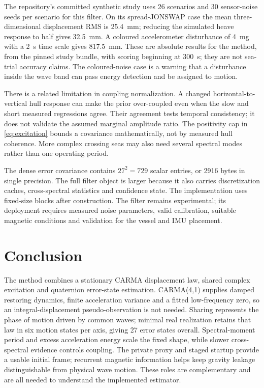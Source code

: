 \documentclass[conference]{IEEEtran}
\begin{document}
The repository's committed synthetic study uses 26 scenarios and 30
sensor-noise seeds per scenario for this filter. On its spread-JONSWAP
case the mean three-dimensional displacement RMS is 25.4~mm; reducing
the simulated heave response to half gives 32.5~mm. A coloured
accelerometer disturbance of 4~mg with a 2~s time scale gives 817.5~mm.
These are absolute results for the method, from the pinned study bundle,
with scoring beginning at 300~s; they are not sea-trial accuracy claims.
The coloured-noise case is a warning that a disturbance inside the
wave band can pass energy detection and be assigned to motion.

There is a related limitation in coupling normalization. A changed
horizontal-to-vertical hull response can make the prior over-coupled even
when the slow and short measured regressions agree. Their agreement
tests temporal consistency; it does not validate the assumed marginal
amplitude ratio. The positivity cap in \cref{eq:excitation} bounds a
covariance mathematically, not by measured hull coherence. More complex
crossing seas may also need several spectral modes rather than one
operating period.

The dense error covariance contains $27^2=729$ scalar entries, or 2916
bytes in single precision. The full filter object is larger because it
also carries discretization caches, cross-spectral statistics and
confidence state. The implementation uses fixed-size blocks after
construction. The filter remains experimental; its deployment requires
measured noise parameters, valid calibration, suitable magnetic conditions
and validation for the vessel and IMU placement.

\section{Conclusion}
The method combines a stationary CARMA displacement law, shared complex
excitation and quaternion error-state estimation. CARMA(4,1) supplies
damped restoring dynamics, finite acceleration variance and a fitted
low-frequency zero, so an integral-displacement pseudo-observation is not
needed. Sharing represents the phase of motion driven by common waves;
minimal real realization retains that law in six motion states per axis,
giving 27 error states overall. Spectral-moment period and excess
acceleration energy scale the fixed shape, while slower cross-spectral
evidence controls coupling. The private proxy and staged startup provide
a usable initial frame; recurrent magnetic information helps keep
gravity leakage distinguishable from physical wave motion. These roles
are complementary and are all needed to understand the implemented
estimator.
\end{document}
